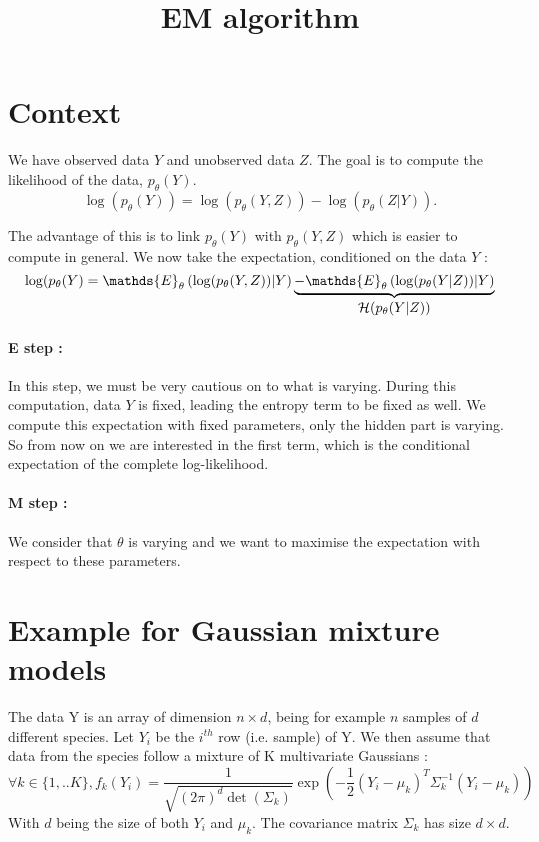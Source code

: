 \documentclass[a4paper,10pt]{article}
\title{EM algorithm}
\author{}
\begin{document}
\maketitle

\begin{abstract}

\end{abstract}

\section{Context}

We have observed data $Y$ and unobserved data $Z$. The goal is to compute the likelihood of the data, $p_\theta (Y)$.
\[ \log(p_\theta (Y)) = \log (p_\theta (Y,Z)) - \log(p_\theta (Z|Y)).\]

The advantage of this is to link $p_\theta(Y)$ with $p_\theta (Y,Z)$ which is easier to compute in general. We now take the expectation,
conditioned on the data $Y$ :
\[ \log(p_\theta (Y) = \mathds{E}_\theta \left(\log(p_\theta (Y,Z))|Y \right) \underbrace{- \mathds{E}_\theta \left(\log(p_\theta (Y|Z))|Y \right)}_{\text{\normalsize{$\mathcal{H}(p_\theta (Y|Z))$}}} \]

\paragraph{E step :}
In this step, we must be very cautious on to what is varying. During this computation, data $Y$ is fixed, leading the entropy term to be fixed as well.
We compute this expectation with fixed parameters, only the hidden part is varying. So from now on we are interested in the first term, which is the conditional expectation of the complete log-likelihood. \\

\paragraph{M step :}
We consider that  $\theta$ is varying and we want to maximise the expectation with respect to these parameters.


\section{Example for Gaussian mixture models}
The data Y is an array of dimension $n\times d$, being for example $n$ samples of $d$ different species. Let
$Y_i$ be the $i^{th}$ row (i.e. sample) of Y. We then assume that data from the species follow a mixture of K multivariate Gaussians :
\[\forall k\in\{1,..K\}, f_k(Y_i) = \frac{1}{\sqrt{(2\pi)^d\det(\Sigma_k)}}\exp\left(-\frac{1}{2}(Y_i - \mu_k)^T\Sigma_k^{-1}(Y_i - \mu_k)\right)\]
With $d$ being the size of both $Y_i$ and $\mu_k$. The covariance matrix $\Sigma_k$ has size $d\times d$.\\
\end{document}
